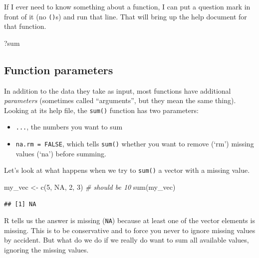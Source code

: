 \documentclass[
]{book}
\newenvironment{Shaded}{\begin{snugshade}}{\end{snugshade}}
\newcommand{\CommentTok}[1]{\textcolor[rgb]{0.56,0.35,0.01}{\textit{#1}}}
\newcommand{\ConstantTok}[1]{\textcolor[rgb]{0.00,0.00,0.00}{#1}}
\newcommand{\DecValTok}[1]{\textcolor[rgb]{0.00,0.00,0.81}{#1}}
\newcommand{\FunctionTok}[1]{\textcolor[rgb]{0.00,0.00,0.00}{#1}}
\newcommand{\NormalTok}[1]{#1}
\newcommand{\OtherTok}[1]{\textcolor[rgb]{0.56,0.35,0.01}{#1}}
\providecommand{\tightlist}{%
  \setlength{\itemsep}{0pt}\setlength{\parskip}{0pt}}
\begin{document}
If I ever need to know something about a function, I can put a question mark in front of it (no \texttt{()}s) and run that line. That will bring up the help document for that function.

\begin{Shaded}
\begin{Highlighting}[]
\NormalTok{?sum}
\end{Highlighting}
\end{Shaded}

\hypertarget{function-parameters}{%
\subsection{Function parameters}\label{function-parameters}}

In addition to the data they take as input, most functions have additional \emph{parameters} (sometimes called ``arguments'', but they mean the same thing). Looking at its help file, the \texttt{sum()} function has two parameters:

\begin{itemize}
\tightlist
\item
  \texttt{...}, the numbers you want to sum
\item
  \texttt{na.rm\ =\ FALSE}, which tells \texttt{sum()} whether you want to remove (`rm') missing values (`na') before summing.
\end{itemize}

Let's look at what happens when we try to \texttt{sum()} a vector with a missing value.

\begin{Shaded}
\begin{Highlighting}[]
\NormalTok{my\_vec }\OtherTok{\textless{}{-}} \FunctionTok{c}\NormalTok{(}\DecValTok{5}\NormalTok{, }\ConstantTok{NA}\NormalTok{, }\DecValTok{2}\NormalTok{, }\DecValTok{3}\NormalTok{) }\CommentTok{\# should be 10}
\FunctionTok{sum}\NormalTok{(my\_vec)}
\end{Highlighting}
\end{Shaded}

\begin{verbatim}
## [1] NA
\end{verbatim}

R tells us the answer is missing (\texttt{NA}) because at least one of the vector elements is missing. This is to be conservative and to force you never to ignore missing values by accident. But what do we do if we really do want to sum all available values, ignoring the missing values.
\end{document}
